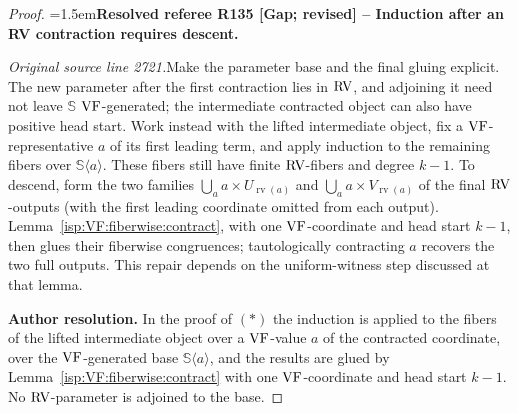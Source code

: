 \documentclass[12pt]{amsart}
\newcommand{\ResolvedRefereeRemark}[5]{%
  \par\medskip\begingroup\normalfont\small\color{gray}%
  \emergencystretch=1.5em\noindent\textbf{Resolved referee R#1 [#2] -- #3.}\par\nobreak\noindent #4\par
  \medskip\color{ResolutionGreen}\noindent\textbf{Author resolution.} #5\par
  \endgroup\medskip
}
\theoremstyle{plain}
\theoremstyle{definition}
\theoremstyle{remark}
\numberwithin{equation}{section}
\theoremstyle{plain}
\newcommand{\VF}{\textup{VF}}
\newcommand{\RV}{\textup{RV}}
\newcommand{\0}{\emptyset}
\newcommand{\la}{\langle}
\newcommand{\ra}{\rangle}
\DeclareMathOperator{\rv}{rv}
\begin{document}
\begin{proof}
\ResolvedRefereeRemark{135}{Gap; revised}{Induction after an RV contraction requires descent}{%
\textit{Original source line 2721.}\quad Make the parameter base and the final gluing explicit. The new parameter after the first contraction lies in $\RV$, and adjoining it need not leave $\mathbb S$ $\VF$-generated; the intermediate contracted object can also have positive head start. Work instead with the lifted intermediate object, fix a $\VF$-representative $a$ of its first leading term, and apply induction to the remaining fibers over $\mathbb S\langle a\rangle$. These fibers still have finite $\RV$-fibers and degree $k-1$. To descend, form the two families $\bigcup_a a\times U_{\rv(a)}$ and $\bigcup_a a\times V_{\rv(a)}$ of the final $\RV$-outputs (with the first leading coordinate omitted from each output). Lemma~\ref{isp:VF:fiberwise:contract}, with one $\VF$-coordinate and head start $k-1$, then glues their fiberwise congruences; tautologically contracting $a$ recovers the two full outputs. This repair depends on the uniform-witness step discussed at that lemma.
}{In the proof of $(\ast)$ the induction is applied to the fibers of the lifted intermediate object over a $\VF$-value $a$ of the contracted coordinate, over the $\VF$-generated base $\mathbb S\la a\ra$, and the results are glued by Lemma~\ref{isp:VF:fiberwise:contract} with one $\VF$-coordinate and head start $k-1$. No $\RV$-parameter is adjoined to the base.}
\end{proof}
\end{document}
